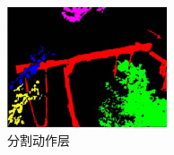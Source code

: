\documentclass[xcolor=svgnames,serif,table]{beamer}
\begin{document}
\begin{frame}
\begin{columns}
    \includegraphics[width=\textwidth]{lag3.png}\\
    分割动作层
  \end{columns}


\end{frame}
\end{document}
